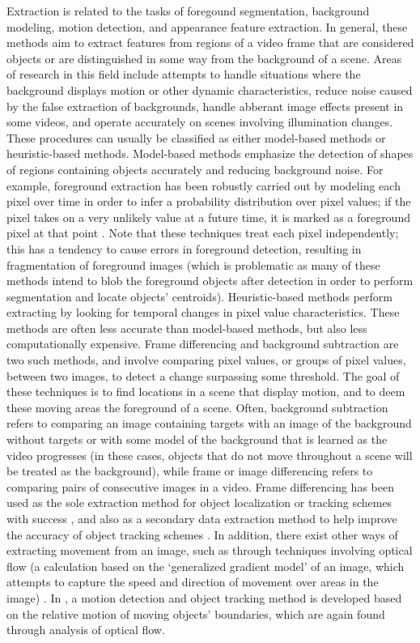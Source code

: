 \documentclass[smallcondensed, final]{svjour3}
\begin{document}
Extraction is related to the tasks of foregound segmentation, background modeling, motion detection, and appearance feature extraction. In general, these methods aim to extract features from regions of a video frame that are considered objects or are distinguished in some way from the background of a scene. Areas of research in this field include attempts to handle situations where the background displays motion or other dynamic characteristics, reduce noise caused by the false extraction of backgrounds, handle abberant image effects present in some videos, and operate accurately on scenes involving illumination changes. These procedures can usually be classified as either model-based methods or heuristic-based methods. Model-based methods emphasize the detection of shapes of regions containing objects accurately and reducing background noise. For example, foreground extraction has been robustly carried out by modeling each pixel over time in order to infer a probability distribution over pixel values; if the pixel takes on a very unlikely value at a future time, it is marked as a foreground pixel at that point \citep{stauffer_1999, elgammal_2000, elgammal_2002}. Note that these techniques treat each pixel independently; this has a tendency to cause errors in foreground detection, resulting in fragmentation of foreground images (which is problematic as many of these methods intend to blob the foreground objects after detection in order to perform segmentation and locate objects' centroids). Heuristic-based methods perform extracting by looking for temporal changes in pixel value characteristics. These methods are often less accurate than model-based methods, but also less computationally expensive. Frame differencing and background subtraction are two such methods, and involve comparing pixel values, or groups of pixel values, between two images, to detect a change surpassing some threshold. The goal of these techniques is to find locations in a scene that display motion, and to deem these moving areas the foreground of a scene.  Often, background subtraction refers to comparing an image containing targets with an image of the background without targets or with some model of the background that is learned as the video progresses (in these cases, objects that do not move throughout a scene will be treated as the background), while frame or image differencing refers to comparing pairs of consecutive images in a video. Frame differencing has been used as the sole extraction method for object localization or tracking schemes with success \citep{pece_2002, beleznai_2006, chu_2007}, and also as a secondary data extraction method to help improve the accuracy of object tracking schemes \citep{perez_2002}. In addition, there exist other ways of extracting movement from an image, such as through techniques involving optical flow (a calculation based on the `generalized gradient model' of an image, which attempts to capture the speed and direction of movement over areas in the image) \citep{horn_1981, bobick_2001}. In \citep{black_2000}, a motion detection and object tracking method is developed based on the relative motion of moving objects' boundaries, which are again found through analysis of optical flow.
\end{document}
